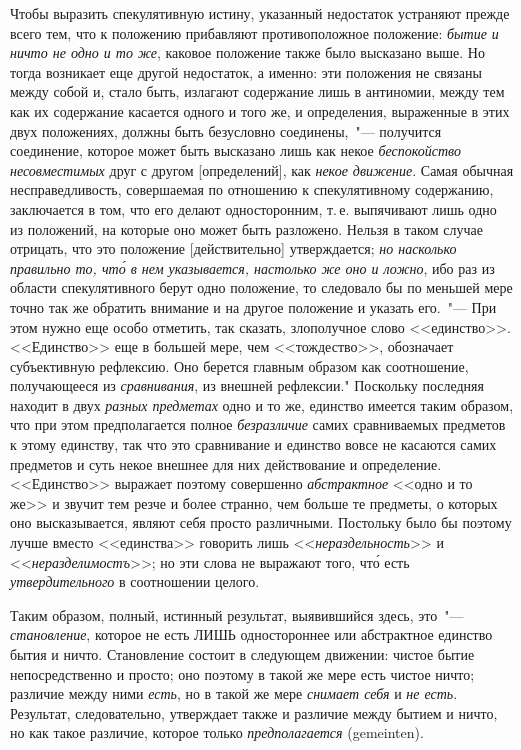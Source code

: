 Чтобы выразить спекулятивную истину, указанный недостаток
устраняют прежде всего тем, что к положению
прибавляют противоположное положение: \emph{бытие и ничто
не одно и то же}, каковое положение также было высказано
выше. Но тогда возникает еще другой недостаток, а
именно: эти положения не связаны между собой и, стало
быть, излагают содержание лишь в антиномии, между
тем как их содержание касается одного и того же, и определения,
выраженные в этих двух положениях, должны
быть безусловно соединены,~"--- получится соединение, которое
может быть высказано лишь как некое \emph{беспокойство
несовместимых} друг с другом [определений], как \emph{некое
движение}. Самая обычная несправедливость, совершаемая
по отношению к спекулятивному содержанию, заключается
в том, что его делают односторонним, т.\,е. выпячивают
лишь одно из положений, на которые оно может
быть разложено. Нельзя в таком случае отрицать, что это
положение [действительно] утверждается; \emph{но насколько
правильно то, чт\'о в нем указывается, настолько же оно
и ложно}, ибо раз из области спекулятивного берут одно
положение, то следовало бы по меньшей мере точно так
же обратить внимание и на другое положение и указать
его.~"--- При этом нужно еще особо отметить, так сказать,
злополучное слово <<единство>>. <<Единство>> еще в большей
мере, чем <<тождество>>, обозначает субъективную
рефлексию. Оно берется главным образом как соотношение,
получающееся из \emph{сравнивания}, из внешней рефлексии."
Поскольку последняя находит в двух \emph{разных предметах}
одно и то же, единство имеется таким образом, что
при этом предполагается полное \emph{безразличие} самих сравниваемых
предметов к этому единству, так что это сравнивание
и единство вовсе не касаются самих предметов
и суть некое внешнее для них действование и определение.
<<Единство>> выражает поэтому совершенно \emph{абстрактное}
<<одно и то же>> и звучит тем резче и более странно,
чем больше те предметы, о которых оно высказывается,
являют себя просто различными. Постольку было бы поэтому
лучше вместо <<единства>> говорить лишь <<\emph{нераздельность}>>
и <<\emph{неразделимостъ}>>; но эти слова не выражают
того, чт\'о есть \emph{утвердительного} в соотношении целого.

Таким образом, полный, истинный результат, выявившийся
здесь, это~"--- \emph{становление}, которое не есть ЛИШЬ
одностороннее или абстрактное единство бытия и ничто.
Становление состоит в следующем движении: чистое бытие
непосредственно и просто; оно поэтому в такой же
мере есть чистое ничто; различие между ними \emph{есть}, но
в такой же мере \emph{снимает себя} и \emph{не есть}. Результат, следовательно,
утверждает также и различие между бытием и
ничто, но как такое различие, которое только \emph{предполагается}
(gemeinten).

